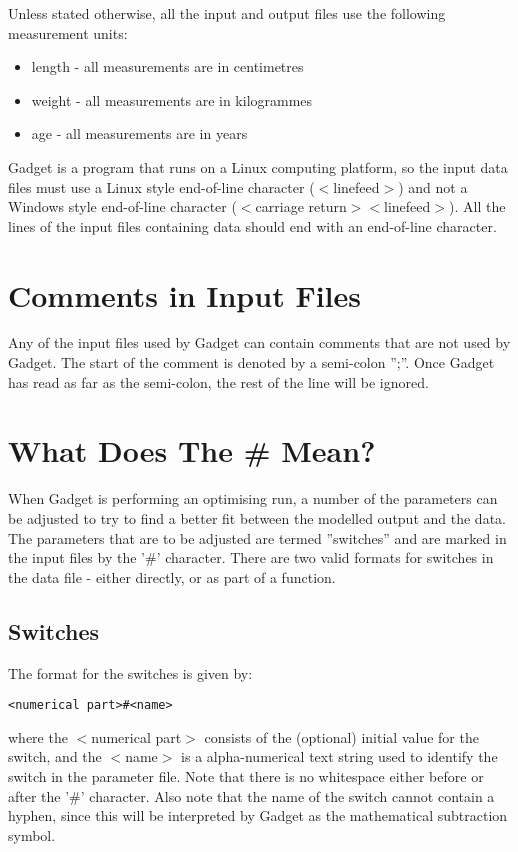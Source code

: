\documentclass[10pt,twoside]{book}
\begin{document}
\bigskip
Unless stated otherwise, all the input and output files use the following measurement units:

\begin{itemize}
\item length - all measurements are in centimetres
\item weight - all measurements are in kilogrammes
\item age - all measurements are in years
\end{itemize}

Gadget is a program that runs on a Linux computing platform, so the input data files must use a Linux style end-of-line character ($<$linefeed$>$) and not a Windows style end-of-line character ($<$carriage return$><$linefeed$>$).  All the lines of the input files containing data should end with an end-of-line character.

\section{Comments in Input Files}\label{sec:comments}
Any of the input files used by Gadget can contain comments that are not used by Gadget.  The start of the comment is denoted by a semi-colon '';''.  Once Gadget has read as far as the semi-colon, the rest of the line will be ignored.

\section{What Does The \# Mean?}\label{sec:whatdoeshash}
When Gadget is performing an optimising run, a number of the parameters can be adjusted to try to find a better fit between the modelled output and the data.  The parameters that are to be adjusted are termed ''switches'' and are marked in the input files by the '\#' character.  There are two valid formats for switches in the data file - either directly, or as part of a function.

\subsection{Switches}
The format for the switches is given by:

{\small\begin{verbatim}
<numerical part>#<name>
\end{verbatim}}

where the $<$numerical part$>$ consists of the (optional) initial value for the switch, and the $<$name$>$ is a alpha-numerical text string used to identify the switch in the parameter file.  Note that there is no whitespace either before or after the '\#' character.  Also note that the name of the switch cannot contain a hyphen, since this will be interpreted by Gadget as the mathematical subtraction symbol.
\end{document}
